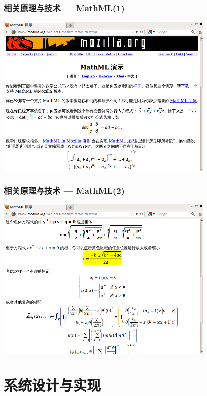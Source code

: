 \documentclass[17pt]{beamer}
\begin{document}
    \begin{frame}
        \frametitle{相关原理与技术 --- MathML(1)}
        \begin{center} %
            \includegraphics[width=0.8\textwidth]{pic/mathml1.png}
        \end{center}
    \end{frame}
    
    \begin{frame}
        \frametitle{相关原理与技术 --- MathML(2)}
        \begin{center}
            \includegraphics[width=0.8\textwidth]{pic/mathml2.png}
        \end{center}
    \end{frame}
    
    \section{系统设计与实现}
    
\end{document}
